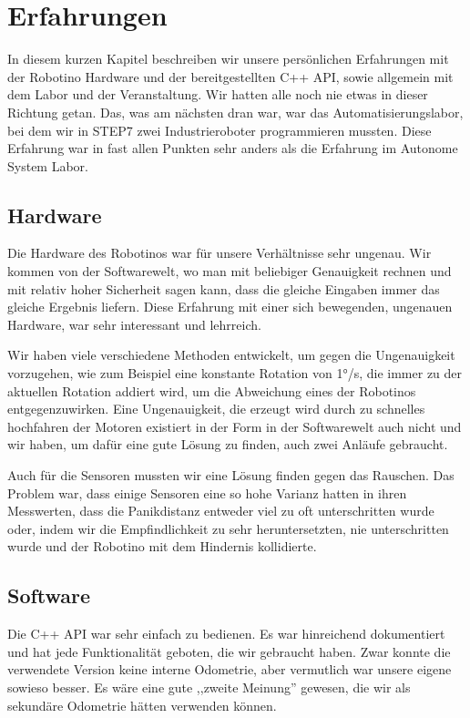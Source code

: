 \chapter{Erfahrungen}

In diesem kurzen Kapitel beschreiben wir unsere persönlichen Erfahrungen mit
der Robotino Hardware und der bereitgestellten C++ API, sowie allgemein mit dem
Labor und der Veranstaltung. Wir hatten alle noch nie etwas in dieser Richtung
getan. Das, was am nächsten dran war, war das Automatisierungslabor, bei dem
wir in STEP7 zwei Industrieroboter programmieren mussten. Diese Erfahrung war
in fast allen Punkten sehr anders als die Erfahrung im Autonome System Labor.


\section{Hardware}

Die Hardware des Robotinos war für unsere Verhältnisse sehr ungenau. Wir kommen
von der Softwarewelt, wo man mit beliebiger Genauigkeit rechnen und mit relativ
hoher Sicherheit sagen kann, dass die gleiche Eingaben immer das gleiche
Ergebnis liefern. Diese Erfahrung mit einer sich bewegenden, ungenauen
Hardware, war sehr interessant und lehrreich.

Wir haben viele verschiedene Methoden entwickelt, um gegen die Ungenauigkeit
vorzugehen, wie zum Beispiel eine konstante Rotation von 1°/s, die immer zu der
aktuellen Rotation addiert wird, um die Abweichung eines der Robotinos
entgegenzuwirken. Eine Ungenauigkeit, die erzeugt wird durch zu schnelles
hochfahren der Motoren existiert in der Form in der Softwarewelt auch nicht und
wir haben, um dafür eine gute Lösung zu finden, auch zwei Anläufe gebraucht.

Auch für die Sensoren mussten wir eine Lösung finden gegen das Rauschen. Das
Problem war, dass einige Sensoren eine so hohe Varianz hatten in ihren
Messwerten, dass die Panikdistanz entweder viel zu oft unterschritten wurde
oder, indem wir die Empfindlichkeit zu sehr heruntersetzten, nie unterschritten
wurde und der Robotino mit dem Hindernis kollidierte.


\section{Software}

Die C++ API war sehr einfach zu bedienen. Es war hinreichend dokumentiert und
hat jede Funktionalität geboten, die wir gebraucht haben. Zwar konnte die
verwendete Version keine interne Odometrie, aber vermutlich war unsere eigene
sowieso besser. Es wäre eine gute ,,zweite Meinung'' gewesen, die wir als
sekundäre Odometrie hätten verwenden können.


